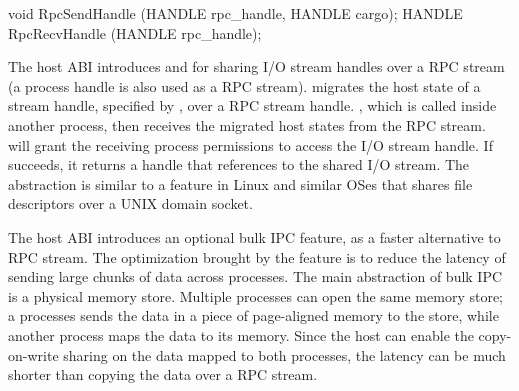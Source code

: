 \begin{paldef}
void   RpcSendHandle (HANDLE rpc_handle, HANDLE cargo);
HANDLE RpcRecvHandle (HANDLE rpc_handle);
\end{paldef}



The host ABI introduces  and  for sharing I/O stream handles over a RPC stream (a process handle is also used as a RPC stream).
migrates the host state of a stream handle, specified by ,
over a RPC stream handle.
,
which is called inside another process,
then receives the migrated host states from the RPC stream.
will grant the receiving process permissions to access the I/O stream handle. %
If  succeeds, it returns a handle
that references to the shared I/O stream.
The abstraction is similar to a feature in Linux and similar OSes that
shares file descriptors over a UNIX domain socket.






The host ABI introduces an optional bulk IPC feature, as a faster alternative to RPC stream.
The optimization brought
by the feature
is to reduce the latency of sending large chunks of data across processes.
The main abstraction of bulk IPC is a physical memory store.
Multiple processes can open the same memory store;
a processes sends the data in a piece of page-aligned memory to the store,
while another process maps the data to its memory.
Since the host can enable the copy-on-write sharing on the data mapped to both processes,
the latency can be much shorter than copying the data over a RPC stream.




